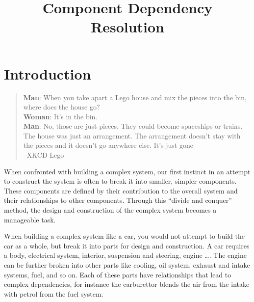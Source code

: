 \documentclass[a4paper]{report}
\title{Component Dependency Resolution}
\begin{document}

{}\tableofcontents

\chapter{Introduction}


\begin{quotation}
\textbf{Man}: When you take apart a Lego house and mix the pieces into the bin, where does the house go?\\
\textbf{Woman}: It's in the bin.\\
\textbf{Man}: No, those are just pieces. They could become spaceships or trains. 
The house was just an arrangement. The arrangement doesn't stay with the pieces and it doesn't go anywhere else. It's just gone\\
--XKCD Lego
\end{quotation}

{}When confronted with building a complex system, our first instinct in an attempt to construct the system is often to break it into smaller, simpler components. 
{}These components are defined by their contribution to the overall system and their relationships to other components.
{}Through this ``divide and conquer'' method, the design and construction of the complex system becomes a manageable task.

When building a complex system like a car, you would not attempt to build the car as a whole, but break it into parts for design and construction.
A car requires a body, electrical system, interior, suspension and steering, engine \ldots. 
The engine can be further broken into other parts like cooling, oil system, exhaust and intake systems, fuel, and so on.
Each of these parts have relationships that lead to complex dependencies, for instance the carburettor blends the air from the intake with petrol from the fuel system.
\end{document}
